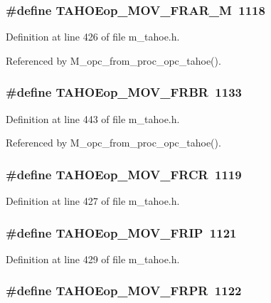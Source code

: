 \subsubsection{\setlength{\rightskip}{0pt plus 5cm}\#define TAHOEop\_\-MOV\_\-FRAR\_\-M~1118}\label{m__tahoe_8h_93c1f660f2101db4fcbf35278e365755}




Definition at line 426 of file m\_\-tahoe.h.

Referenced by M\_\-opc\_\-from\_\-proc\_\-opc\_\-tahoe().
\subsubsection{\setlength{\rightskip}{0pt plus 5cm}\#define TAHOEop\_\-MOV\_\-FRBR~1133}\label{m__tahoe_8h_652781aed27918e8916b5fd1ac5a16ba}




Definition at line 443 of file m\_\-tahoe.h.

Referenced by M\_\-opc\_\-from\_\-proc\_\-opc\_\-tahoe().
\subsubsection{\setlength{\rightskip}{0pt plus 5cm}\#define TAHOEop\_\-MOV\_\-FRCR~1119}\label{m__tahoe_8h_fe61c44af8c8d2806c34c9d0b1b1a383}




Definition at line 427 of file m\_\-tahoe.h.
\subsubsection{\setlength{\rightskip}{0pt plus 5cm}\#define TAHOEop\_\-MOV\_\-FRIP~1121}\label{m__tahoe_8h_693a7924e7fe44f291b0f85056a643a8}




Definition at line 429 of file m\_\-tahoe.h.
\subsubsection{\setlength{\rightskip}{0pt plus 5cm}\#define TAHOEop\_\-MOV\_\-FRPR~1122}\label{m__tahoe_8h_bdb56a25b05ebee4224a59eb5b5ab080}





